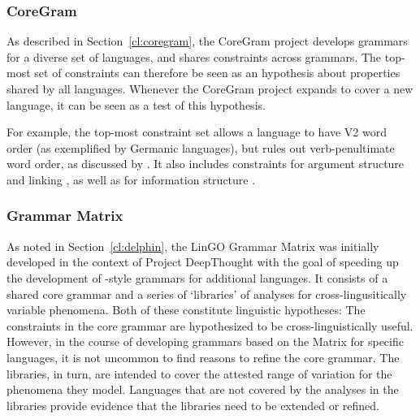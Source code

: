 \documentclass[output=paper,nonflat]{langsci/langscibook}
\begin{document}
\subsubsection{CoreGram}
\label{cl:lang-doc:coregram}

As described in Section~\ref{cl:coregram},
the CoreGram project develops grammars for a diverse set of languages,
and shares constraints across grammars.
The top-most set of constraints can therefore be seen
as an hypothesis about properties shared by all languages.
Whenever the CoreGram project expands to cover a new language,
it can be seen as a test of this hypothesis.

For example, the top-most constraint set
allows a language to have V2 word order
(as exemplified by Germanic languages),
but rules out verb-penultimate word order,
as discussed by \citet{MuellerCoreGram}
.
It also includes constraints for argument structure and linking
,
as well as for information structure
.



\subsubsection{Grammar Matrix}
\label{cl:lang-doc:gmcs}

As noted in Section~\ref{cl:delphin}, the LinGO Grammar Matrix
\cite{BFO2002a-u,BDFPS2010a-u} was initially developed in
the context of Project DeepThought with the goal of speeding up the
development of \delphin-style grammars for additional languages. It
consists of a shared core grammar and a series of `libraries' of
analyses for cross-lingusitically variable phenomena. Both of these
constitute linguistic hypotheses: The constraints
in the core grammar are hypothesized to be cross-linguistically
useful. However, in the course of developing grammars based on the
Matrix for specific languages, it is not uncommon to find reasons to
refine the core grammar. The libraries, in turn, are intended to 
cover the attested range of variation for the phenomena they model.
Languages that are not covered by the analyses in the libraries provide
evidence that the libraries need to be extended or refined. 
\end{document}
